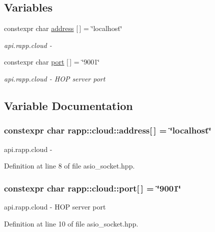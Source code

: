 \subsection*{Variables}
\begin{DoxyCompactItemize}
\item 
constexpr char \hyperlink{namespacerapp_1_1cloud_afb654734a7584ea0243e431aaebd4728}{address} \mbox{[}$\,$\mbox{]} = \char`\"{}localhost\char`\"{}
\begin{DoxyCompactList}\small\item\em api.\-rapp.\-cloud -\/ \end{DoxyCompactList}\item 
constexpr char \hyperlink{namespacerapp_1_1cloud_ae0e4cb6fd54bbf45234fc3c21f752b7a}{port} \mbox{[}$\,$\mbox{]} = \char`\"{}9001\char`\"{}
\begin{DoxyCompactList}\small\item\em api.\-rapp.\-cloud -\/ H\-O\-P server port \end{DoxyCompactList}\end{DoxyCompactItemize}


\subsection{Variable Documentation}
\hypertarget{namespacerapp_1_1cloud_afb654734a7584ea0243e431aaebd4728}{
\subsubsection[{address}]{\setlength{\rightskip}{0pt plus 5cm}constexpr char rapp\-::cloud\-::address\mbox{[}$\,$\mbox{]} = \char`\"{}localhost\char`\"{}}}\label{namespacerapp_1_1cloud_afb654734a7584ea0243e431aaebd4728}


api.\-rapp.\-cloud -\/ 



Definition at line 8 of file asio\-\_\-socket.\-hpp.

\hypertarget{namespacerapp_1_1cloud_ae0e4cb6fd54bbf45234fc3c21f752b7a}{
\subsubsection[{port}]{\setlength{\rightskip}{0pt plus 5cm}constexpr char rapp\-::cloud\-::port\mbox{[}$\,$\mbox{]} = \char`\"{}9001\char`\"{}}}\label{namespacerapp_1_1cloud_ae0e4cb6fd54bbf45234fc3c21f752b7a}


api.\-rapp.\-cloud -\/ H\-O\-P server port 



Definition at line 10 of file asio\-\_\-socket.\-hpp.

